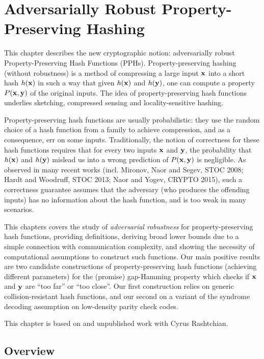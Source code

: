 
\chapter{Adversarially Robust Property-Preserving Hashing}\label{chap:PPH}
This chapter describes the new cryptographic notion: adversarially robust Property-Preserving Hash Functions (PPHs). Property-preserving hashing (without robustness) is a method of compressing a large input $\mathbf{{x}}$ into a short hash $h(\mathbf{{x}})$ in such a way that given $h(\mathbf{{x}})$ and $h(\mathbf{{y}})$, one can compute a property $P(\mathbf{{x}},\mathbf{{y}})$ of the original inputs. The idea of property-preserving hash functions underlies sketching, compressed sensing and locality-sensitive hashing.

Property-preserving hash functions are usually probabilistic: they use the random choice of a hash function from a family to achieve compression, and as a consequence, err on some inputs. Traditionally, the notion of correctness for these hash functions requires that for every two inputs $\mathbf{{x}}$ and $\mathbf{{y}}$, the probability that $h(\mathbf{{x}})$ and $h(\mathbf{{y}})$ mislead us into a wrong prediction of $P(\mathbf{{x}},\mathbf{{y}})$ is negligible. As observed in many recent works (incl. Mironov, Naor and Segev, STOC 2008; Hardt and Woodruff, STOC 2013; Naor and Yogev, CRYPTO 2015), such a correctness guarantee assumes that the adversary (who produces the offending inputs) has no information about the hash function, and is too weak in many scenarios.

This chapters covers the study of {\em adversarial robustness} for property-preserving hash functions, providing definitions, deriving broad lower bounds due to a simple connection with communication complexity, and showing the necessity of computational assumptions to construct such functions. Our main positive results are two candidate constructions of property-preserving hash functions (achieving different parameters) for the (promise) gap-Hamming property which checks if $\mathbf{{x}}$ and $\mathbf{{y}}$ are ``too far'' or ``too close''. Our first construction relies on generic collision-resistant hash functions, and our second on a variant of the syndrome decoding assumption on low-density parity check codes.

This chapter is based on \cite{BLV19} and unpublished work with Cyrus Rashtchian.

\section{Overview}\label{sec:pph-intro}


